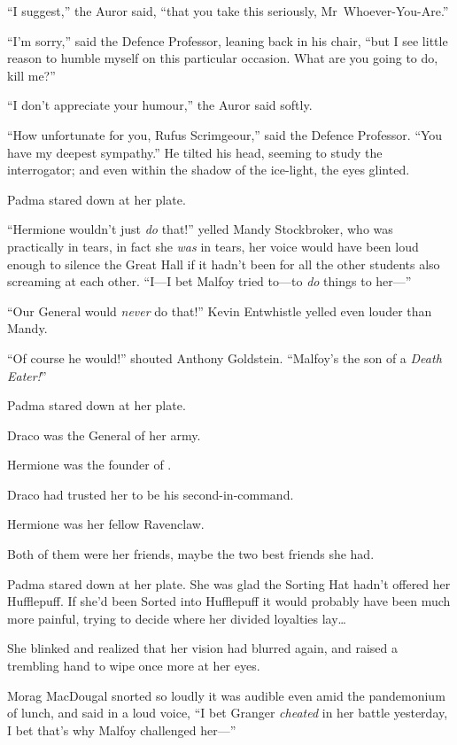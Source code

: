 “I suggest,” the Auror said, “that you take this seriously, Mr~Whoever-You-Are.”

“I’m sorry,” said the Defence Professor, leaning back in his chair, “but I see little reason to humble myself on this particular occasion. What are you going to do, kill me?”

“I don’t appreciate your humour,” the Auror said softly.

“How unfortunate for you, Rufus Scrimgeour,” said the Defence Professor. “You have my deepest sympathy.” He tilted his head, seeming to study the interrogator; and even within the shadow of the ice-light, the eyes glinted.

\later

Padma stared down at her plate.

“Hermione wouldn’t just \emph{do} that!” yelled Mandy Stockbroker, who was practically in tears, in fact she \emph{was} in tears, her voice would have been loud enough to silence the Great Hall if it hadn’t been for all the other students also screaming at each other. “I—I bet Malfoy tried to—to \emph{do} things to her—”

“Our General would \emph{never} do that!” Kevin Entwhistle yelled even louder than Mandy.

“Of course he would!” shouted Anthony Goldstein. “Malfoy’s the son of a \emph{Death Eater!}”

Padma stared down at her plate.

Draco was the General of her army.

Hermione was the founder of \SPHEW.

Draco had trusted her to be his second-in-command.

Hermione was her fellow Ravenclaw.

Both of them were her friends, maybe the two best friends she had.

Padma stared down at her plate. She was glad the Sorting Hat hadn’t offered her Hufflepuff. If she’d been Sorted into Hufflepuff it would probably have been much more painful, trying to decide where her divided loyalties lay…

She blinked and realized that her vision had blurred again, and raised a trembling hand to wipe once more at her eyes.

Morag MacDougal snorted so loudly it was audible even amid the pandemonium of lunch, and said in a loud voice, “I bet Granger \emph{cheated} in her battle yesterday, I bet that’s why Malfoy challenged her—”

